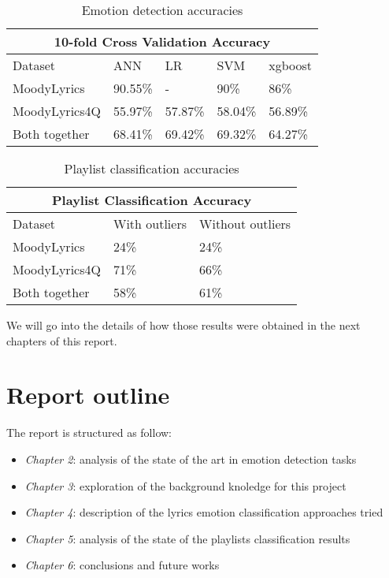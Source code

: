 \begin{table}[H]
\centering
\begin{tabular}{ |p{3cm}||p{1.5cm}|p{1.5cm}|p{1.5cm}|p{1.5cm}|  }
 \hline
 \multicolumn{5}{|c|}{10-fold Cross Validation Accuracy} \\
 \hline
 Dataset & ANN & LR &SVM & xgboost\\
 \hline
MoodyLyrics  & 90.55\%    &- &  90\% & 86\%\\
MoodyLyrics4Q  & 55.97\%    &57.87\% &  58.04\% & 56.89\%\\
Both together &   68.41\%  & 69.42\%   &69.32\% &64.27\%\\
\hline
\end{tabular}
\caption{Emotion detection accuracies} \label{tab:compar}
\end{table}

\begin{table}[H]
\centering
\begin{tabular}{ |p{3cm}||p{1.5cm}|p{1.5cm}| }
 \hline
 \multicolumn{3}{|c|}{Playlist Classification Accuracy} \\
 \hline
Dataset & With outliers & Without outliers\\
 \hline
MoodyLyrics & 24\% & 24\%\\
MoodyLyrics4Q  & 71\%    &66\%\\
Both together &   58\%  & 61\%\\
\hline
\end{tabular}
\caption{Playlist classification accuracies} \label{tab:compar2}
\end{table}

We will go into the details of how those results were obtained in the next chapters of this report.

\section{Report outline}
The report is structured as follow: 
\begin{itemize}
\item \textit{Chapter 2}: analysis of the state of the art in emotion detection tasks
\item \textit{Chapter 3}: exploration of the background knoledge for this project
\item \textit{Chapter 4}: description of the lyrics emotion classification approaches tried
\item \textit{Chapter 5}: analysis of the state of the playlists classification results
\item \textit{Chapter 6}: conclusions and future works
\end{itemize}











